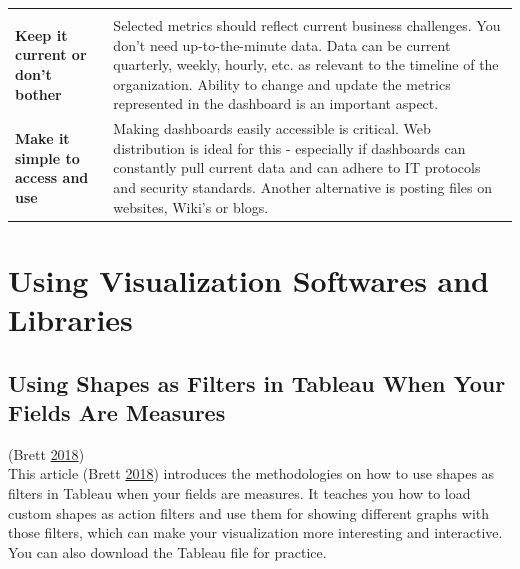 \documentclass[]{book}
\begin{document}
\begin{longtable}[]{@{}ll@{}}
\begin{minipage}[t]{0.72\columnwidth}
\end{minipage}\tabularnewline
\begin{minipage}[t]{0.17\columnwidth}\raggedright\strut
\textbf{Keep it current or don't bother}\strut
\end{minipage} & \begin{minipage}[t]{0.72\columnwidth}\raggedright\strut
Selected metrics should reflect current business challenges. You don't
need up-to-the-minute data. Data can be current quarterly, weekly,
hourly, etc. as relevant to the timeline of the organization. Ability to
change and update the metrics represented in the dashboard is an
important aspect.\strut
\end{minipage}\tabularnewline
\begin{minipage}[t]{0.17\columnwidth}\raggedright\strut
\textbf{Make it simple to access and use}\strut
\end{minipage} & \begin{minipage}[t]{0.72\columnwidth}\raggedright\strut
Making dashboards easily accessible is critical. Web distribution is
ideal for this - especially if dashboards can constantly pull current
data and can adhere to IT protocols and security standards. Another
alternative is posting files on websites, Wiki's or blogs.\strut
\end{minipage}\tabularnewline
\bottomrule
\end{longtable}

\section{Using Visualization Softwares and
Libraries}\label{using-visualization-softwares-and-libraries}

\subsection{Using Shapes as Filters in Tableau When Your Fields Are
Measures}\label{using-shapes-as-filters-in-tableau-when-your-fields-are-measures}

(Brett \protect\hyperlink{ref-measures}{2018})\\
This article (Brett \protect\hyperlink{ref-measures}{2018}) introduces
the methodologies on how to use shapes as filters in Tableau when your
fields are measures. It teaches you how to load custom shapes as action
filters and use them for showing different graphs with those filters,
which can make your visualization more interesting and interactive. You
can also download the Tableau file for practice.
\end{document}
